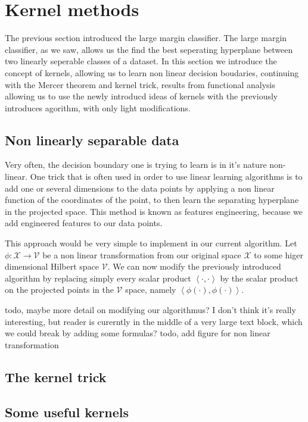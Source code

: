 \section {Kernel methods}

The previous section introduced the large margin classifier. The large margin classifier, as we saw, allows us the find the best seperating hyperplane between two linearly seperable classes of a dataset. In this section we introduce the concept of kernels, allowing us to learn non linear decision boudaries, continuing with the Mercer theorem and kernel trick, results from functional analysis allowing us to use the newly introducd ideas of kernels with the previously introduces agorithm, with only light modifications.

\subsection{Non linearly separable data}

Very often, the decision boundary one is trying to learn is in it's nature non-linear. One trick that is often used in order to use linear learning algorithms is to add one or several dimensions to the data points by applying a non linear function of the coordinates of the point, to then learn the separating hyperplane in the projected space. This method is known as features engineering, because we add engineered features to our data points.


This approach would be very simple to implement in our current algorithm. Let $\phi : \mathcal{X} \rightarrow \mathcal{V}$ be a non linear transformation from our original space $\mathcal{X}$ to some higer dimensional Hilbert space $\mathcal{V}$. We can now modify the previously introduced algorithm by replacing simply every scalar product $\left<\cdot , \cdot\right>$ by the scalar product on the projected points in the $\mathcal{V}$ space, namely $\left<\phi(\cdot), \phi(\cdot)\right>$.



\textcolor[rgb]{1,0,0}{todo, maybe more detail on modifying our algorithmus? I don't think it's really interesting, but reader is curerntly in the middle of a very large text block, which we could break by adding some formulas? }
\textcolor[rgb]{1,0,0}{todo, add figure for non linear transformation}

\iffalse The method of projecting the dataset in a higher dimensional with some non linear function, while being easy to implement, suffers from the cost of the intermediate representation of the dataset. Indeed, one has to choose between finding the right projection space to where to linear separation of the data is made possible, and not choosing a too high dimensional projection space, otherwise making the algorithm to expensive in terms of memory and runtime. Fortunately, we will now present the kernel trick and show how it solves this one exact problem in a non intrusive way.
\fi

\subsection {The kernel trick}



\subsection {Some useful kernels}

